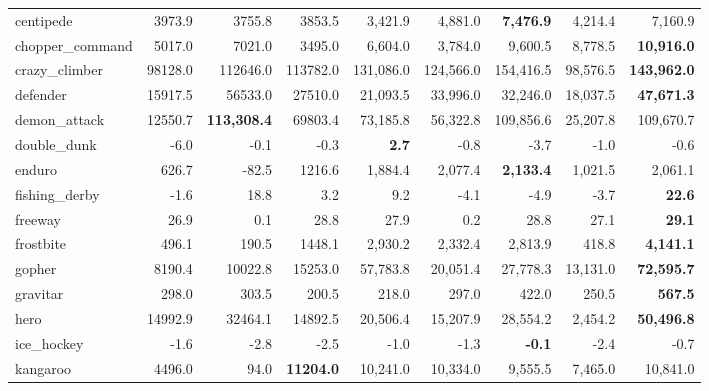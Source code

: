 \documentclass[letterpaper]{article} %
\begin{document}
\begin{table*}[t]
{\begin{tabular}{l|rrrrrrrr}
         centipede &    3973.9 &    3755.8 &    3853.5 &     3,421.9 &    4,881.0 &       {\bf  7,476.9 }&    4,214.4 &    7,160.9 \\
   chopper\_command &    5017.0 &    7021.0 &    3495.0 &     6,604.0 &    3,784.0 &        9,600.5 &    8,778.5 &  {\bf  10,916.0 }\\
     crazy\_climber &   98128.0 &  112646.0 &  113782.0 &   131,086.0 &  124,566.0 &      154,416.5 &   98,576.5 &  {\bf 143,962.0 }\\
          defender &   15917.5 &   56533.0 &   27510.0 &    21,093.5 &   33,996.0 &       32,246.0 &   18,037.5 &  {\bf  47,671.3 }\\
      demon\_attack &   12550.7 & {\bf 113,308.4 }&   69803.4 &    73,185.8 &   56,322.8 &      109,856.6 &   25,207.8 &  109,670.7 \\
       double\_dunk &      -6.0 &      -0.1 &      -0.3 &        {\bf  2.7} &       -0.8 &           -3.7 &       -1.0 &       -0.6 \\
            enduro &     626.7 &     -82.5 &    1216.6 &     1,884.4 &    2,077.4 &       {\bf  2,133.4 }&    1,021.5 &    2,061.1 \\
     fishing\_derby &      -1.6 &      18.8 &       3.2 &         9.2 &       -4.1 &           -4.9 &       -3.7 &      {\bf  22.6 }\\
           freeway &      26.9 &       0.1 &      28.8 &        27.9 &        0.2 &           28.8 &       27.1 &    {\bf    29.1 }\\
         frostbite &     496.1 &     190.5 &    1448.1 &     2,930.2 &    2,332.4 &        2,813.9 &      418.8 &   {\bf  4,141.1} \\
            gopher &    8190.4 &   10022.8 &   15253.0 &    57,783.8 &   20,051.4 &       27,778.3 &   13,131.0 & {\bf   72,595.7 }\\
          gravitar &     298.0 &     303.5 &     200.5 &       218.0 &      297.0 &          422.0 &      250.5 &   {\bf    567.5 }\\
              hero &   14992.9 &   32464.1 &   14892.5 &    20,506.4 &   15,207.9 &       28,554.2 &    2,454.2 &  {\bf  50,496.8 }\\
        ice\_hockey &      -1.6 &      -2.8 &      -2.5 &        -1.0 &       -1.3 &          {\bf  -0.1} &       -2.4 &       -0.7 \\
          kangaroo &    4496.0 &      94.0 &  {\bf  11204.0 }&    10,241.0 &   10,334.0 &        9,555.5 &    7,465.0 &   10,841.0 \\

\end{tabular}}
\end{table*}
\end{document}
